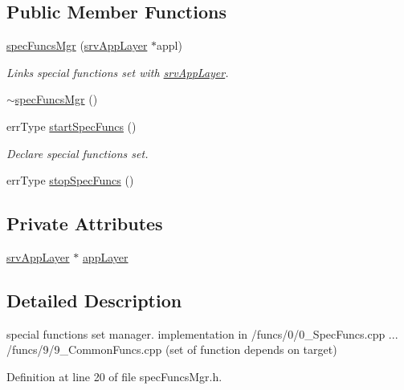 \subsection*{Public Member Functions}
\begin{DoxyCompactItemize}
\item 
\hyperlink{classspecFuncsMgr_a1302c62d8783a64c05bf57154afa4d41}{specFuncsMgr} (\hyperlink{classsrvAppLayer}{srvAppLayer} $\ast$appl)
\begin{DoxyCompactList}\small\item\em Links special functions set with \hyperlink{classsrvAppLayer}{srvAppLayer}. \item\end{DoxyCompactList}\item 
\hyperlink{classspecFuncsMgr_a0c2d695cd7d4c39d01ade7b7bd069f45}{$\sim$specFuncsMgr} ()
\item 
errType \hyperlink{classspecFuncsMgr_a73d45791bdd32eaf44340f26401fc74c}{startSpecFuncs} ()
\begin{DoxyCompactList}\small\item\em Declare special functions set. \item\end{DoxyCompactList}\item 
errType \hyperlink{classspecFuncsMgr_ad341c6094a6f7a68cd6f794bb1c5e789}{stopSpecFuncs} ()
\end{DoxyCompactItemize}
\subsection*{Private Attributes}
\begin{DoxyCompactItemize}
\item 
\hyperlink{classsrvAppLayer}{srvAppLayer} $\ast$ \hyperlink{classspecFuncsMgr_a93ceaf51f84974e1bc44c626f4f98154}{appLayer}
\end{DoxyCompactItemize}


\subsection{Detailed Description}
special functions set manager. implementation in /funcs/0/0\_\-SpecFuncs.cpp ... /funcs/9/9\_\-CommonFuncs.cpp (set of function depends on target) 

Definition at line 20 of file specFuncsMgr.h.



